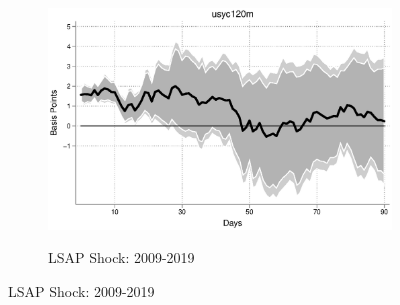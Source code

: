 \documentclass{article}
\begin{document}
\begin{figure}[tbph]
	\begin{subfigure}[t]{\textwidth}
		\begin{center}
			\includegraphics[trim={0cm 0cm 0cm 0cm},clip,height=0.26\textheight,width=1\textwidth]{../Figures/LPs/LagDep-FX/LSAP/US/usyc120m09-19lsap.eps} \\
			\caption{LSAP Shock: 2009-2019} \label{subfig:LPUS10Ylsap}
		\end{center}
	\end{subfigure}
	
\end{figure}
\end{document}
